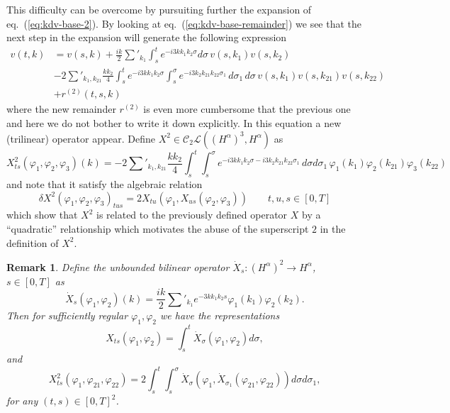 \documentclass[a4paper,12pt,reqno]{article}
\newcommand{\der}{\delta}
\newcommand{\CC}{\mathcal{C}}
\newcommand{\LL}{\mathcal{L}}
\newtheorem{remark}[theorem]{Remark}
\begin{document}
This difficulty can be overcome by pursuiting further the expansion of
eq.~(\ref{eq:kdv-base-2}). By looking at
eq.~(\ref{eq:kdv-base-remainder}) we see that the next step in the
expansion will generate the following expression
\begin{equation}
  \label{eq:exp-step-2}
  \begin{split}
 v(t,k) & =   v(s,k) + \frac{ik}2 \sum'_{k_1} \int_s^t e^{-i 3 k k_1 k_2 \sigma}
  d\sigma\,  v(s,k_1)  v(s,k_2)    
\\ &   - 2 \sum'_{k_1,k_{21}}  \frac{k k_2}4  \int_s^t e^{-i 3 k k_1 k_2 \sigma}
    \int_s^\sigma
   e^{- i 3 k_2 k_{21} k_{22} \sigma_1}
 \, d\sigma_1   \, d\sigma\,  v(s,k_1)   v(s,k_{21})  v(s,k_{22})  
\\ &   + r^{(2)}(t,s,k)
  \end{split}
\end{equation}
where the new remainder $r^{(2)}$ is even more cumbersome that the
previous one and here we do not bother to write it down explicitly. In this equation a new (trilinear) operator
appear. Define $X^2 \in \CC_2 \LL((H^\alpha)^3, H^\alpha)$ as
\begin{equation}
  \label{eq:X2}
X^2_{ts}(\varphi_1,\varphi_2,\varphi_3)(k) =  
- 2 \sum'_{k_1,k_{21}}  \frac{k k_2}4  \int_s^t  \int_s^\sigma e^{-i 3
  k k_1 k_2 \sigma
- i 3 k_2 k_{21} k_{22} \sigma_1}
 \, d\sigma   d\sigma_1\,  \varphi_1(k_1)   \varphi_2(k_{21})  \varphi_3(k_{22})  
\end{equation}
and note that it satisfy the algebraic relation
\begin{equation}
  \label{eq:area-eq}
  \der X^2(\varphi_1,\varphi_2,\varphi_3)_{tus} = 2 X_{tu}(\varphi_1,X_{us}(\varphi_2,\varphi_3))
\qquad t,u,s \in [0,T]
\end{equation}
which show that $X^2$ is related to the previously defined operator
$X$ by a ``quadratic'' relationship which motivates the abuse of the superscript $2$
in the
definition of $X^2$.  



\begin{remark}
\label{rem:repr}
Define the unbounded bilinear operator $\dot X_s : (H^\alpha)^2 \to
H^\alpha$, $s\in[0,T]$ as
$$
\dot X_s(\varphi_1,\varphi_2) (k) = \frac{ik}{2}\sum'_{k_1} e^{-3k k_1 k_2
  s}\varphi_1(k_1) \varphi_2(k_2).
$$
Then for sufficiently regular $\varphi_1,\varphi_2$ we have the representations
$$
X_{ts}(\varphi_1,\varphi_2) = \int_s^t \dot
X_\sigma(\varphi_1,\varphi_2) d\sigma,
$$
and
$$
X^2_{ts}(\varphi_1,\varphi_{21},\varphi_{22}) = 2 \int_s^t \int_s^\sigma
\dot
X_\sigma(\varphi_1,\dot X_{\sigma_1}(\varphi_{21},\varphi_{22}))
d\sigma d\sigma_1,
$$
for any $(t,s) \in [0,T]^2$.
\end{remark}
\end{document}
